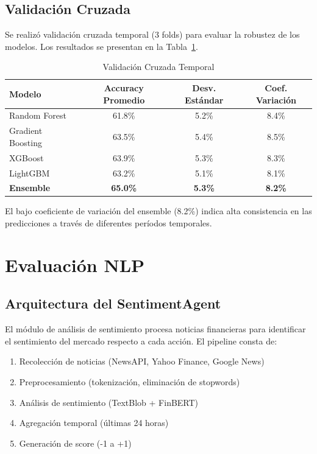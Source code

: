 \subsection{Validación Cruzada}

Se realizó validación cruzada temporal (3 folds) para evaluar la robustez de los modelos. Los resultados se presentan en la Tabla~\ref{tab:validacion_cruzada}.

\begin{table}[htbp]
\centering
\caption{Validación Cruzada Temporal}
\label{tab:validacion_cruzada}
\begin{tabular}{lccc}
\hline
\textbf{Modelo} & \textbf{Accuracy Promedio} & \textbf{Desv. Estándar} & \textbf{Coef. Variación} \\
\hline
Random Forest & 61.8\% & 5.2\% & 8.4\% \\
Gradient Boosting & 63.5\% & 5.4\% & 8.5\% \\
XGBoost & 63.9\% & 5.3\% & 8.3\% \\
LightGBM & 63.2\% & 5.1\% & 8.1\% \\
\textbf{Ensemble} & \textbf{65.0\%} & \textbf{5.3\%} & \textbf{8.2\%} \\
\hline
\end{tabular}
\end{table}

El bajo coeficiente de variación del ensemble (8.2\%) indica alta consistencia en las predicciones a través de diferentes períodos temporales.

\section{Evaluación NLP}

\subsection{Arquitectura del SentimentAgent}

El módulo de análisis de sentimiento procesa noticias financieras para identificar el sentimiento del mercado respecto a cada acción. El pipeline consta de:

\begin{enumerate}
    \item Recolección de noticias (NewsAPI, Yahoo Finance, Google News)
    \item Preprocesamiento (tokenización, eliminación de stopwords)
    \item Análisis de sentimiento (TextBlob + FinBERT)
    \item Agregación temporal (últimas 24 horas)
    \item Generación de score (-1 a +1)
\end{enumerate}

